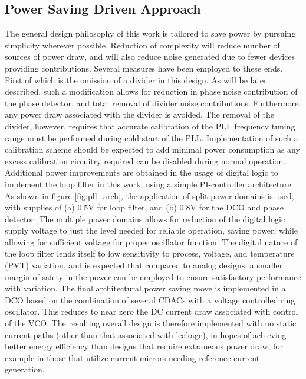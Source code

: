 	\subsection{Power Saving Driven Approach}
	The general design philosophy of this work is tailored to save power by pursuing simplicity wherever possible. Reduction of complexity will reduce number of sources of power draw, and will also reduce noise generated due to fewer devices providing contributions. Several measures have been employed to these ends. First of which is the omission of a divider in this design. As will be later described, such a modification allows for reduction in phase noise contribution of the phase detector, and total removal of divider noise contributions. Furthermore, any power draw associated with the divider is avoided. The removal of the divider, however, requires that accurate calibration of the PLL frequency tuning range must be performed during cold start of the PLL. Implementation of such a calibration scheme should be expected to add minimal power consumption as any excess calibration circuitry required can be disabled during normal operation. Additional power improvements are obtained in the usage of digital logic to implement the loop filter in this work, using a simple PI-controller architecture. As shown in figure \ref{fig:pll_arch}, the application of split power domains is used, with supplies of (a) 0.5V for loop filter, and (b) 0.8V for the DCO and phase detector. The multiple power domains allows for reduction of the digital logic supply voltage to just the level needed for reliable operation, saving power, while allowing for sufficient voltage for proper oscillator function. The digital nature of the loop filter lends itself to low sensitivity to process, voltage, and temperature (PVT) variation, and is expected that compared to analog designs, a smaller margin of safety in the power can be employed to ensure satisfactory performance with variation. The final architectural power saving move is implemented in a DCO based on the combination of several CDACs with a voltage controlled ring oscillator. This reduces to near zero the DC current draw associated with control of the VCO. The resulting overall design is therefore implemented with no static current paths (other than that associated with leakage), in hopes of achieving better energy efficiency than designs that require extraneous power draw, for example in those that utilize current mirrors needing reference current generation.

